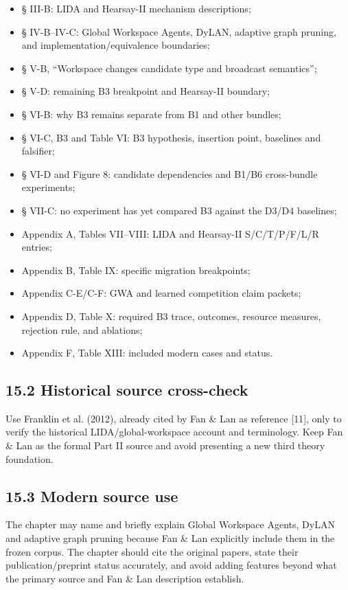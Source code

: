\begin{itemize}
\tightlist
\item
  § III-B: LIDA and Hearsay-II mechanism descriptions;
\item
  § IV-B--IV-C: Global Workspace Agents, DyLAN, adaptive graph pruning, and implementation/equivalence boundaries;
\item
  § V-B, ``Workspace changes candidate type and broadcast semantics'';
\item
  § V-D: remaining B3 breakpoint and Hearsay-II boundary;
\item
  § VI-B: why B3 remains separate from B1 and other bundles;
\item
  § VI-C, B3 and Table VI: B3 hypothesis, insertion point, baselines and falsifier;
\item
  § VI-D and Figure 8: candidate dependencies and B1/B6 cross-bundle experiments;
\item
  § VII-C: no experiment has yet compared B3 against the D3/D4 baselines;
\item
  Appendix A, Tables VII--VIII: LIDA and Hearsay-II S/C/T/P/F/L/R entries;
\item
  Appendix B, Table IX: specific migration breakpoints;
\item
  Appendix C-E/C-F: GWA and learned competition claim packets;
\item
  Appendix D, Table X: required B3 trace, outcomes, resource measures, rejection rule, and ablations;
\item
  Appendix F, Table XIII: included modern cases and status.
\end{itemize}

\subsection{15.2 Historical source cross-check}\label{152-historical-source-cross-check}

Use Franklin et al. (2012), already cited by Fan \& Lan as reference {[}11{]}, only to verify the historical LIDA/global-workspace account and terminology. Keep Fan \& Lan as the formal Part II source and avoid presenting a new third theory foundation.

\subsection{15.3 Modern source use}\label{153-modern-source-use}

The chapter may name and briefly explain Global Workspace Agents, DyLAN and adaptive graph pruning because Fan \& Lan explicitly include them in the frozen corpus. The chapter should cite the original papers, state their publication/preprint status accurately, and avoid adding features beyond what the primary source and Fan \& Lan description establish.

